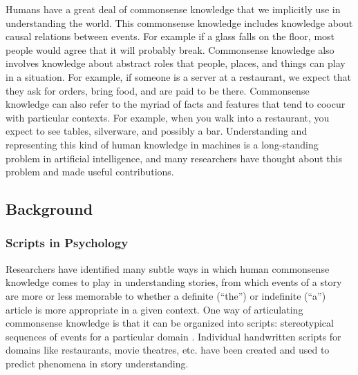 \documentclass[10pt,a4paper]{article}
\newcommand{\todo}[1]{{\color{red}#1}}
\begin{document}
Humans have a great deal of commonsense knowledge that we implicitly use in understanding the world.
This commonsense knowledge includes knowledge about causal relations between events.
For example if a glass falls on the floor, most people would agree that it will probably break.
Commonsense knowledge also involves knowledge about abstract roles that people, places, and things can play in a situation.
For example, if someone is a server at a restaurant, we expect that they ask for orders, bring food, and are paid to be there.
Commonsense knowledge can also refer to the myriad of facts and features that tend to coocur with particular contexts.
For example, when you walk into a restaurant, you expect to see tables, silverware, and possibly a bar.
Understanding and representing this kind of human knowledge in machines is a long-standing problem in artificial intelligence, and many researchers have \todo{thought about this problem and made useful contributions.}

\subsection{Background}

\subsubsection{Scripts in Psychology}

Researchers have identified many subtle ways in which human commonsense knowledge comes to play in understanding stories, from which events of a story are more or less memorable to whether a definite (“the”) or indefinite (“a”) article is more appropriate in a given context. One way of articulating commonsense knowledge is that it can be organized into scripts: stereotypical sequences of events for a particular domain . Individual handwritten scripts for domains like restaurants, movie theatres, etc. have been created and used to predict phenomena in story understanding.
\end{document}
